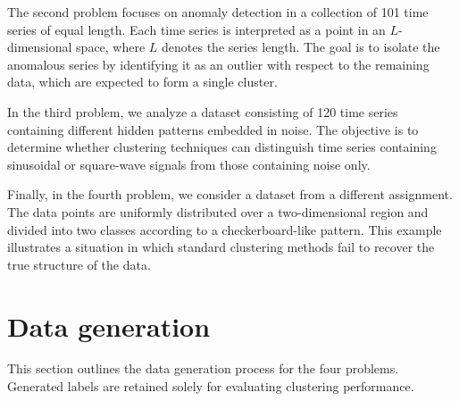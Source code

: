\documentclass[prl,twocolumn]{revtex4-1}
\begin{document}
The second problem focuses on anomaly detection in a collection of 101 time series of equal length.
Each time series is interpreted as a point in an $L$-dimensional space, where $L$ denotes the series length.
The goal is to isolate the anomalous series by identifying it as an outlier with respect to the remaining data, which are expected to form a single cluster.

In the third problem, we analyze a dataset consisting of 120 time series containing different hidden patterns embedded in noise.
The objective is to determine whether clustering techniques can distinguish time series containing sinusoidal or square-wave signals from those containing noise only.

Finally, in the fourth problem, we consider a dataset from a different assignment.
The data points are uniformly distributed over a two-dimensional region and divided into two classes according to a checkerboard-like pattern.
This example illustrates a situation in which standard clustering methods fail to recover the true structure of the data.

\section{Data generation}

This section outlines the data generation process for the four problems.
Generated labels are retained solely for evaluating clustering performance.

\end{document}
